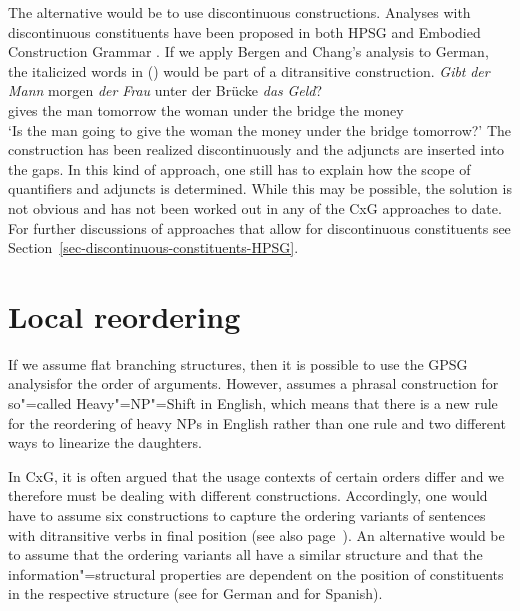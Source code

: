 \addlines
The alternative would be to use discontinuous constructions. Analyses with discontinuous constituents have been proposed in both 
HPSG \citep{Reape94a} and Embodied Construction Grammar \citep{BC2005a}. If we apply Bergen and Chang's analysis to German,
the italicized words in () would be part of a ditransitive construction.
\ea
\gll \emph{Gibt} \emph{der} \emph{Mann} morgen \emph{der} \emph{Frau} unter der Brücke \emph{das} \emph{Geld}?\\
	 gives the man tomorrow the woman under the bridge the money\\
\glt `Is the man going to give the woman the money under the bridge tomorrow?'
\z
The construction has been realized discontinuously and the adjuncts are inserted into the gaps.
In this kind of approach, one still has to explain how the scope of quantifiers and adjuncts is determined.
While this may be possible, the solution is not obvious and has not been worked out in any of the
CxG approaches to date. For further discussions of approaches that allow for discontinuous constituents see Section~\ref{sec-discontinuous-constituents-HPSG}.

\section{Local reordering}

If we assume flat branching structures, then it is possible to use the GPSG analysis\indexgpsg for the order of arguments.
However, \citet{Kay2002a} assumes a phrasal construction for so"=called Heavy"=NP"=Shift in English, which means that there is a new rule for
the reordering of heavy NPs in English rather than one rule and two different ways to linearize the daughters.

In CxG, it is often argued that the usage contexts of certain orders differ and we therefore must be dealing with different constructions.
Accordingly, one would have to assume six constructions to capture the ordering variants of
sentences with ditransitive verbs in final position (see also page~\pageref{Regeln-PSG-Abfolge}). An alternative would be to assume that the ordering
variants all have a similar structure and that the information"=structural properties are dependent
on the position of constituents in the respective structure (see \citealp{deKuthy2000a} for German and \citealp{Bildhauer2008a}
for Spanish).

